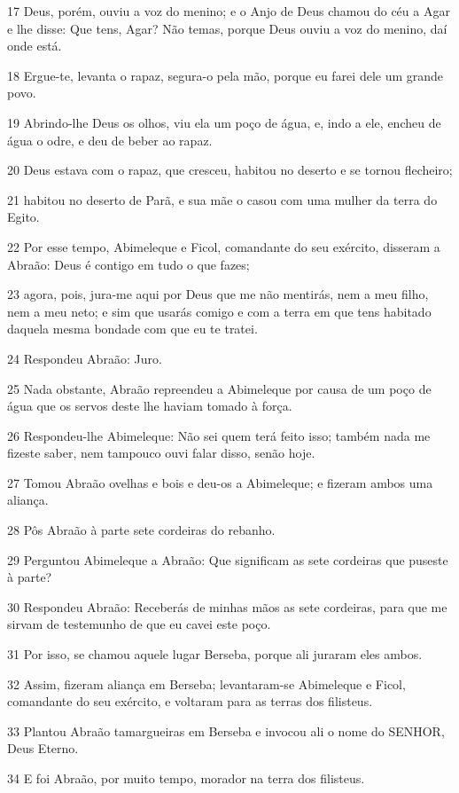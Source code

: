 \par 17 Deus, porém, ouviu a voz do menino; e o Anjo de Deus chamou do céu a Agar e lhe disse: Que tens, Agar? Não temas, porque Deus ouviu a voz do menino, daí onde está.
\par 18 Ergue-te, levanta o rapaz, segura-o pela mão, porque eu farei dele um grande povo.
\par 19 Abrindo-lhe Deus os olhos, viu ela um poço de água, e, indo a ele, encheu de água o odre, e deu de beber ao rapaz.
\par 20 Deus estava com o rapaz, que cresceu, habitou no deserto e se tornou flecheiro;
\par 21 habitou no deserto de Parã, e sua mãe o casou com uma mulher da terra do Egito.
\par 22 Por esse tempo, Abimeleque e Ficol, comandante do seu exército, disseram a Abraão: Deus é contigo em tudo o que fazes;
\par 23 agora, pois, jura-me aqui por Deus que me não mentirás, nem a meu filho, nem a meu neto; e sim que usarás comigo e com a terra em que tens habitado daquela mesma bondade com que eu te tratei.
\par 24 Respondeu Abraão: Juro.
\par 25 Nada obstante, Abraão repreendeu a Abimeleque por causa de um poço de água que os servos deste lhe haviam tomado à força.
\par 26 Respondeu-lhe Abimeleque: Não sei quem terá feito isso; também nada me fizeste saber, nem tampouco ouvi falar disso, senão hoje.
\par 27 Tomou Abraão ovelhas e bois e deu-os a Abimeleque; e fizeram ambos uma aliança.
\par 28 Pôs Abraão à parte sete cordeiras do rebanho.
\par 29 Perguntou Abimeleque a Abraão: Que significam as sete cordeiras que puseste à parte?
\par 30 Respondeu Abraão: Receberás de minhas mãos as sete cordeiras, para que me sirvam de testemunho de que eu cavei este poço.
\par 31 Por isso, se chamou aquele lugar Berseba, porque ali juraram eles ambos.
\par 32 Assim, fizeram aliança em Berseba; levantaram-se Abimeleque e Ficol, comandante do seu exército, e voltaram para as terras dos filisteus.
\par 33 Plantou Abraão tamargueiras em Berseba e invocou ali o nome do SENHOR, Deus Eterno.
\par 34 E foi Abraão, por muito tempo, morador na terra dos filisteus.

